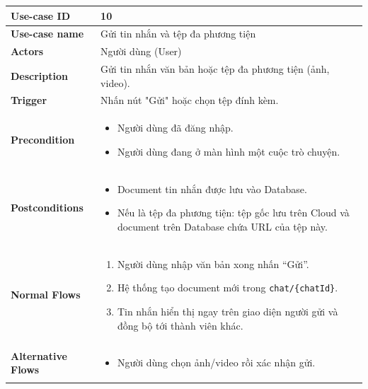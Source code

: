 \documentclass[a4paper, 12pt]{article}
\begin{document}
	
	
	\begin{longtable}{|p{3.5cm}|p{12cm}|}
		\hline
		\textbf{Use-case ID} & 10 \\
		\hline
		\textbf{Use-case name} & Gửi tin nhắn và tệp đa phương tiện \\
		\hline
		\textbf{Actors} & Người dùng (User) \\
		\hline
		\textbf{Description} & Gửi tin nhắn văn bản hoặc tệp đa phương tiện (ảnh, video). \\
		\hline
		\textbf{Trigger} & Nhấn nút "Gửi" hoặc chọn tệp đính kèm. \\
		\hline
		\textbf{Precondition} & 
		\begin{itemize}[label=+, leftmargin=1.5em] 
			\item Người dùng đã đăng nhập.
			\item Người dùng đang ở màn hình một cuộc trò chuyện.
		\end{itemize} \\
		\hline
		\textbf{Postconditions} & 
		\begin{itemize}[label=+, leftmargin=1.5em]
			\item Document tin nhắn được lưu vào Database.
			\item Nếu là tệp đa phương tiện: tệp gốc lưu trên Cloud và document trên Database chứa URL của tệp này.
		\end{itemize} \\
		\hline
		\textbf{Normal Flows} & 
		\begin{enumerate}[leftmargin=1.5em] 
			\item Người dùng nhập văn bản xong nhấn “Gửi”.
			\item Hệ thống tạo document mới trong \texttt{chat/\{chatId\}}.
			\item Tin nhắn hiển thị ngay trên giao diện người gửi và đồng bộ tới thành viên khác.
		\end{enumerate} \\
		\hline
		\textbf{Alternative Flows} & 
		\begin{itemize}[leftmargin=3em, labelsep=0.5em] 
			\item[1.1.] Người dùng chọn ảnh/video rồi xác nhận gửi.

\end{itemize}
\end{longtable}
\end{document}
